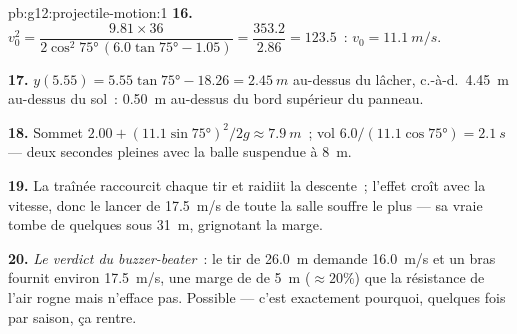 \begin{solution}{pb:g12:projectile-motion:1}
\textbf{16.} $v_0^2 = \dfrac{9.81 \times 36}{2\cos^2\ang{75}\,
(6.0\tan\ang{75} - 1.05)} = \dfrac{353.2}{2.86} = 123.5$~:
$v_0 = \qty{11.1}{m/s}$.

\textbf{17.} $y(5.55) = 5.55\tan\ang{75} - 18.26 = \qty{2.45}{m}$
au-dessus du lâcher, c.-à-d.\ \qty{4.45}{m} au-dessus du sol~:
\qty{0.50}{m} au-dessus du bord supérieur du panneau.

\textbf{18.} Sommet $2.00 + (11.1\sin\ang{75})^2/2g \approx
\qty{7.9}{m}$~; vol $6.0/(11.1\cos\ang{75}) = \qty{2.1}{s}$ ---
deux secondes pleines avec la balle suspendue à \qty{8}{m}.

\textbf{19.} La traînée raccourcit chaque tir et raidiit la descente~;
l'effet croît avec la vitesse, donc le lancer de \qty{17.5}{m/s} de
toute la salle souffre le plus --- sa vraie  tombe
de quelques  sous \qty{31}{m}, grignotant la marge.

\textbf{20.} \emph{Le verdict du buzzer-beater}~: le tir de
\qty{26.0}{m} demande \qty{16.0}{m/s} et un bras fournit environ
\qty{17.5}{m/s}, une marge de  de \qty{5}{m}
($\approx 20\%$) que la résistance de l'air rogne mais n'efface pas.
Possible --- c'est exactement pourquoi, quelques fois par saison, ça
rentre.
\end{solution}
